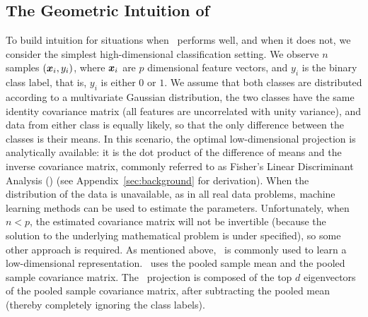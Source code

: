 \documentclass[11pt]{extarticle}
\begin{document}
\subsection*{The Geometric Intuition of \Lol}


To build intuition for situations when \Lol~performs well, and when it does not,
we consider the simplest high-dimensional classification setting.
We observe $n$ samples $(\boldsymbol{x}_i,y_i)$, where $\boldsymbol{x}_i$ are $p$ dimensional feature vectors, and $y_i$ is the binary class label, that is, $y_i$ is either $0$ or $1$.
We assume that both classes are distributed according to a multivariate Gaussian distribution,  the two classes have the same identity covariance matrix  (all features are uncorrelated with unity variance), and data from either class is equally likely, so that the only difference between the classes is their means.
In this scenario, the optimal low-dimensional projection is analytically available: it is the dot product of the difference of means and the inverse covariance matrix, commonly referred to as Fisher's Linear Discriminant Analysis (\Lda) \cite{Bickel2004a} (see Appendix~\ref{sec:background} for derivation).
When the distribution of the data is unavailable, as in all real data problems, machine learning methods can be used to estimate the parameters.
Unfortunately, when $n<p$, the estimated covariance matrix will not be invertible (because the solution to the underlying mathematical problem is under specified), so some other approach is required.
As mentioned above, \Pca~is commonly used to learn a low-dimensional representation.
\Pca~uses the pooled sample mean
and the pooled sample covariance matrix.
The \Pca~projection is composed of the top $d$ eigenvectors of the pooled sample covariance matrix, after subtracting the pooled mean (thereby completely ignoring the class labels).
\end{document}
